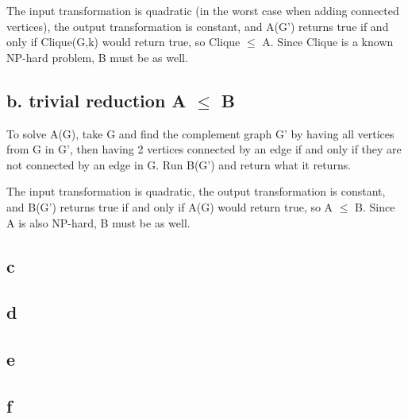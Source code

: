 \documentclass[a4paper]{article}
\begin{document}
The input transformation is quadratic (in the worst case when adding connected vertices), the output transformation is constant, and A(G') returns true if and only if Clique(G,k) would return true, so Clique $\leq$ A. Since Clique is a known NP-hard problem, B must be as well.

\subsection{b. trivial reduction A $\leq$ B}
To solve A(G), take G and find the complement graph G' by having all vertices from G in G', then having 2 vertices connected by an edge if and only if they are not connected by an edge in G. Run B(G') and return what it returns.

The input transformation is quadratic, the output transformation is constant, and B(G') returns true if and only if A(G) would return true, so A $\leq$ B. Since A is also NP-hard, B must be as well.

\subsection{c}

\subsection{d}

\subsection{e}

\subsection{f}
\end{document}
